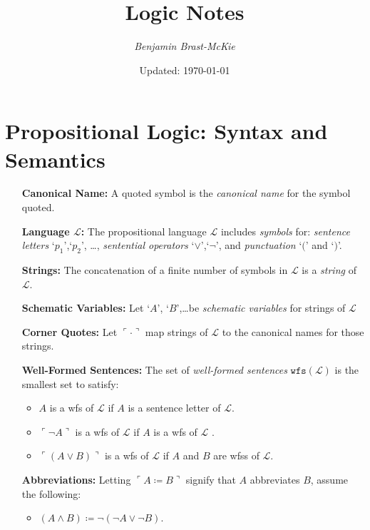\documentclass[a4paper, 11pt]{article} %
\title{\textbf{Logic Notes}} %
\author{\em Benjamin Brast-McKie} %
\date{Updated: \today} %
\makeatletter
\newcommand{\corner}[1]{\ulcorner#1\urcorner} %
\newcommand{\wfs}[1]{\texttt{wfs}(#1)}
\renewcommand{\L}[0]{\mathcal{L}}
\renewcommand{\maketitle}{ %
\begin{flushright} %
{\@date\hfill \LARGE\@title} %

\vspace{5pt} %

{\@author} %

\end{flushright}
}
\makeatother
\begin{document}
\maketitle %
\thispagestyle{empty}



\section*{\sc Propositional Logic: Syntax and Semantics}

\begin{enumerate}[leftmargin=1.2in,labelsep=.15in] %
  \item[\bf Canonical Name:] A quoted symbol is the \textit{canonical name} for the symbol quoted.
  \item[\bf Language $\boldsymbol{\L}$:] The propositional language $\L$ includes \textit{symbols} for: \textit{sentence letters} `$p_1$',`$p_2$', \dots, \textit{sentential operators} `$\vee$',`$\neg$', and \textit{punctuation} `$($' and `$)$'.
  \item[\bf Strings:] The concatenation of a finite number of symbols in $\L$ is a \textit{string} of $\L$.
  \item[\bf Schematic Variables:] Let `$A$', `$B$',\ldots be \textit{schematic variables} for strings of $\L$
  \item[\bf Corner Quotes:] Let $\corner{\cdot}$ map strings of $\L$ to the canonical names for those strings.
  \item[\bf Well-Formed Sentences:] The set of \textit{well-formed sentences} $\wfs{\L}$ is the smallest set to satisfy:
    \begin{itemize}\small
      \item $A$ is a wfs of $\L$ if $A$ is a sentence letter of $\L$. 
      \item $\corner{\neg A}$ is a wfs of $\L$ if $A$ is a wfs of $\L$ .
      \item $\corner{(A\vee B)}$ is a wfs of $\L$ if $A$ and $B$ are wfss of $\L$.
    \end{itemize}
  \item[\bf Abbreviations:] Letting $\corner{A \coloneq B}$ signify that $A$ abbreviates $B$, assume the following:
    \begin{itemize}\small
      \item $(A\wedge B) \coloneq \neg(\neg A\vee\neg B)$.

\end{itemize}
\end{enumerate}
\end{document}
